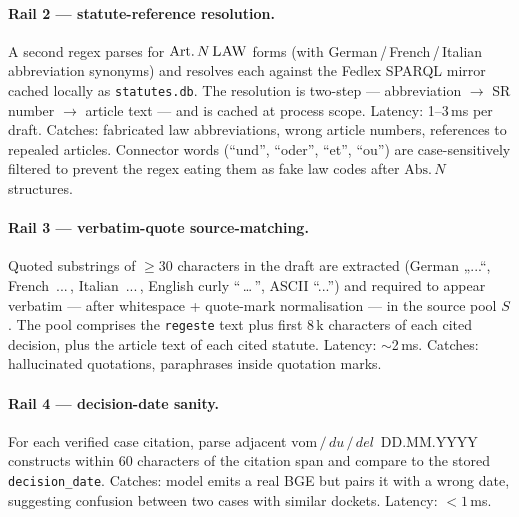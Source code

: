 \documentclass[11pt,a4paper]{article}
\begin{document}
\paragraph{Rail 2 --- statute-reference resolution.}
A second regex parses for $\text{Art.}\,N\,\textsc{LAW}$
forms (with German\,/\,French\,/\,Italian abbreviation
synonyms) and resolves each against the Fedlex SPARQL
mirror cached locally as \texttt{statutes.db}.  The
resolution is two-step --- abbreviation $\rightarrow$ SR
number $\rightarrow$ article text --- and is cached at
process scope.  Latency: 1--3\,ms per draft.  Catches:
fabricated law abbreviations, wrong article numbers,
references to repealed articles.  Connector words
(``und'', ``oder'', ``et'', ``ou'') are case-sensitively
filtered to prevent the regex eating them as fake law
codes after $\text{Abs.}\,N$ structures.

\paragraph{Rail 3 --- verbatim-quote source-matching.}
Quoted substrings of $\geq 30$ characters in the draft
are extracted (German „...\textquotedblleft, French
\guillemotleft\,...\,\guillemotright, Italian
\guillemotleft\,...\,\guillemotright, English curly
``\,\dots\,'', ASCII ``...'') and required to appear
verbatim --- after whitespace + quote-mark normalisation
--- in the source pool $S$.  The pool comprises the
\texttt{regeste} text plus first 8\,k characters of
each cited decision, plus the article text of each
cited statute.  Latency: $\sim$2\,ms.  Catches:
hallucinated quotations, paraphrases inside quotation
marks.

\paragraph{Rail 4 --- decision-date sanity.}
For each verified case citation, parse adjacent
$\text{vom}\,/\,du\,/\,del\,$ DD.MM.YYYY constructs
within 60 characters of the citation span and compare
to the stored \texttt{decision\_date}.  Catches: model
emits a real BGE but pairs it with a wrong date,
suggesting confusion between two cases with similar
dockets.  Latency: $<\!1$\,ms.
\end{document}
